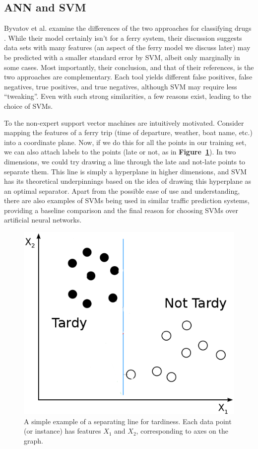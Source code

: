 \documentclass[11pt]{article} %
\begin{document}
\subsection{ANN and SVM}
\label{sec:ann_svm}
Byvatov et al. examine the differences of the two approaches for classifying drugs
\cite{byvatov2003comparison}. While their model certainly isn't for a ferry 
system, their discussion suggests data sets with many features (an aspect of the 
ferry model we discuss later) may be predicted with a smaller standard error by
SVM, albeit only marginally in some cases. Most importantly, their conclusion,
and that of their references, is the two approaches are complementary. Each 
tool yields different false positives, false negatives, true
positives, and true negatives, although SVM may require less ``tweaking''. Even
with such strong similarities, a few reasons exist, leading to the choice of SVMs.

To the non-expert support vector machines are intuitively motivated. Consider 
mapping the
features of a ferry trip (time of departure, weather, boat name, etc.) into a
coordinate plane.  Now, if we do this for all the points in our training set,
we can also attach labels to the points (late or not, as in 
\textbf{Figure~\ref{fig:basic_svm_data}}). In two dimensions, we
could try drawing a line through the late and not-late points to separate them.
This line is simply a hyperplane in higher dimensions, and SVM has its theoretical
underpinnings based on the idea of drawing this hyperplane as an optimal separator. 
Apart from the possible ease of use and understanding, there are also examples of 
SVMs being used in similar traffic prediction systems, providing a baseline 
comparison and the final reason for choosing SVMs over artificial neural networks.

\begin{figure}[h]
  \centering
  \includegraphics[scale=.5]{images/basic_svm_data.png}
  \caption{A simple example of a separating line for tardiness. 
      Each data point (or instance) has features $X_1$ and $X_2$, corresponding
      to axes on the graph.}
  \label{fig:basic_svm_data}
\end{figure}
\end{document}
